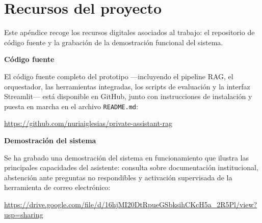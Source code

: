 \chapter{Recursos del proyecto}\label{app:recursos}

Este apéndice recoge los recursos digitales asociados al trabajo: el repositorio de código fuente y la grabación de la demostración funcional del sistema.

\bigskip

\noindent\textbf{Código fuente}

\smallskip\noindent
El código fuente completo del prototipo —incluyendo el pipeline RAG, el orquestador, las herramientas integradas, los scripts de evaluación y la interfaz Streamlit— está disponible en GitHub, junto con instrucciones de instalación y puesta en marcha en el archivo \texttt{README.md}:

\medskip
\begin{center}
\mbox{\url{https://github.com/nuriaiglesias/private-assistant-rag}}
\end{center}

\bigskip

\noindent\textbf{Demostración del sistema}

\smallskip\noindent
Se ha grabado una demostración del sistema en funcionamiento que ilustra las principales capacidades del asistente: consulta sobre documentación institucional, abstención ante preguntas no respondibles y activación supervisada de la herramienta de correo electrónico:

\medskip
\begin{center}
{\small\mbox{\url{https://drive.google.com/file/d/16hjMI20DtRpueGSbksihCKcH5a_2R5Pl/view?usp=sharing}}}
\end{center}
